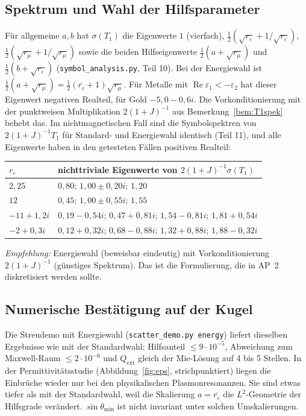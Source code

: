 \documentclass[11pt, a4paper]{article}
\theoremstyle{plain}
\theoremstyle{definition}
\begin{document}
\subsection{Spektrum und Wahl der Hilfsparameter}

Für allgemeine $a,b$ hat $\sigma(T_1)$ die Eigenwerte $1$ (vierfach),
$\tfrac12(\sqrt{r_\varepsilon}+1/\sqrt{r_\varepsilon})$,
$\tfrac12(\sqrt{r_\mu}+1/\sqrt{r_\mu})$ sowie die beiden Hilfseigenwerte
$\tfrac12(a+\sqrt{r_\mu})$ und $\tfrac12(b+\sqrt{r_\varepsilon})$
(\texttt{symbol\_analysis.py}, Teil 10). Bei der Energiewahl ist
$\tfrac12(a+\sqrt{r_\mu}) = \tfrac12(\overline{r_\varepsilon}+1)\sqrt{r_\mu}$. Für
Metalle mit $\operatorname{Re}\varepsilon_1<-\varepsilon_2$ hat dieser Eigenwert
negativen Realteil, für Gold $-5{,}0-0{,}6i$. Die Vorkonditionierung mit der
punktweisen Multiplikation $2(1+J)^{-1}$ aus Bemerkung~\ref{bem:T1spek} behebt
das. Im nichtmagnetischen Fall sind die Symbolspektren von $2(1+J)^{-1}T_1$ für
Standard- und Energiewahl identisch (Teil 11), und alle Eigenwerte haben in den
getesteten Fällen positiven Realteil:

\begin{center}\small
\begin{tabular}{ll}
\toprule
$r_\varepsilon$ & nichttriviale Eigenwerte von $2(1+J)^{-1}\sigma(T_1)$\\
\midrule
$2{,}25$ & $0{,}80$; $1{,}00\pm0{,}20i$; $1{,}20$\\
$12$ & $0{,}45$; $1{,}00\pm0{,}55i$; $1{,}55$\\
$-11+1{,}2i$ & $0{,}19-0{,}54i$; $0{,}47+0{,}81i$; $1{,}54-0{,}81i$; $1{,}81+0{,}54i$\\
$-2+0{,}3i$ & $0{,}12+0{,}32i$; $0{,}68-0{,}88i$; $1{,}32+0{,}88i$; $1{,}88-0{,}32i$\\
\bottomrule
\end{tabular}
\end{center}

\emph{Empfehlung:} Energiewahl (beweisbar eindeutig) mit Vorkonditionierung
$2(1+J)^{-1}$ (günstiges Spektrum). Das ist die Formulierung, die in AP~2
diskretisiert werden sollte.

\subsection{Numerische Bestätigung auf der Kugel}

Die Streudemo mit Energiewahl (\texttt{scatter\_demo.py energy}) liefert dieselben
Ergebnisse wie mit der Standardwahl: Hilfsanteil $\le 9\cdot10^{-5}$, Abweichung
zum Maxwell-Raum $\le2\cdot10^{-6}$ und $Q_{\mathrm{ext}}$ gleich der Mie-Lösung
auf 4 bis 5 Stellen. In der Permittivitätsstudie (Abbildung~\ref{fig:eps},
strichpunktiert) liegen die Einbrüche wieder nur bei den physikalischen
Plasmonresonanzen. Sie sind etwas tiefer als mit der Standardwahl, weil die
Skalierung $a=\overline{r_\varepsilon}$ die $L^2$-Geometrie der Hilfsgrade verändert.
$\sin\theta_{\min}$ ist nicht invariant unter solchen Umskalierungen.
\end{document}
